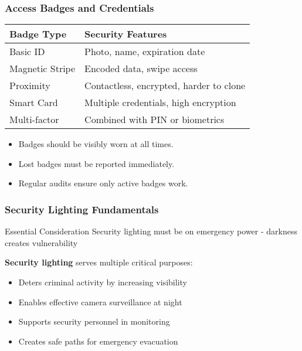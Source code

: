 \documentclass{beamer}
\begin{document}
\begin{frame}
    \frametitle{Access Badges and Credentials}
    \begin{table}
        \begin{tabular}{|p{}|p{}|}
            \hline
            \textbf{Badge Type} & \textbf{Security Features} \\
            \hline
            Basic ID & Photo, name, expiration date \\
            \hline
            Magnetic Stripe & Encoded data, swipe access \\
            \hline
            Proximity & Contactless, encrypted, harder to clone \\
            \hline
            Smart Card & Multiple credentials, high encryption \\
            \hline
            Multi-factor & Combined with PIN or biometrics \\
            \hline
        \end{tabular}
    \end{table}
    \begin{itemize}
        \item Badges should be visibly worn at all times.
        \item Lost badges must be reported immediately.
        \item Regular audits ensure only active badges work.
    \end{itemize}
\end{frame}

\begin{frame}
    \frametitle{Security Lighting Fundamentals}
    \begin{alertblock}{Essential Consideration}
        Security lighting must be on emergency power - darkness creates vulnerability
    \end{alertblock}
    
    \textbf{Security lighting} serves multiple critical purposes:
    \begin{itemize}
        \item Deters criminal activity by increasing visibility
        \item Enables effective camera surveillance at night
        \item Supports security personnel in monitoring
        \item Creates safe paths for emergency evacuation
    \end{itemize}
\end{frame}
\end{document}
